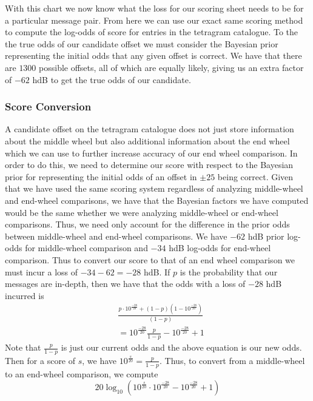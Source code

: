 \noindent With this chart we now know what the loss for our scoring sheet needs to be for a particular message pair. From here we can use our exact same scoring method to compute the log-odds of score for entries in the tetragram catalogue. To the the true odds of our candidate offset we must consider the Bayesian prior representing the initial odds that any given offset is correct. We have that there are $1300$ possible offsets, all of which are equally likely, giving us an extra factor of $-62$ hdB to get the true odds of our candidate.
\subsubsection{Score Conversion} A candidate offset on the tetragram catalogue does not just store information about the middle wheel but also additional information about the end wheel which we can use to further increase accuracy of our end wheel comparison. In order to do this, we need to determine our score with respect to the Bayesian prior for representing the initial odds of an offset in $\pm25$ being correct. Given that we have used the same scoring system regardless of analyzing middle-wheel and end-wheel comparisons, we have that the Bayesian factors we have computed would be the same whether we were analyzing middle-wheel or end-wheel comparisons. Thus, we need only account for the difference in the prior odds between middle-wheel and end-wheel comparisons. We have $-62$ hdB prior log-odds for middle-wheel comparison and $-34$ hdB log-odds for end-wheel comparison. Thus to convert our score to that of an end wheel comparison we must incur a loss of $-34-62 = -28$ hdB. If $p$ is the probability that our messages are in-depth, then we have that the odds with a loss of $-28$ hdB incurred is
\begin{align*}
	 & \frac{p\cdot10^{\frac{-28}{20}} + (1-p)(1-10^{\frac{-28}{20}})}{(1-p)} \\
	 & = 10^{\frac{-28}{20}}\frac{p}{1-p}-10^{\frac{-28}{20}} + 1
\end{align*}
Note that $\frac{p}{1-p}$ is just our current odds and the above equation is our new odds. Then for a score of $s$, we have $10^\frac{s}{20} = \frac{p}{1-p}$. Thus, to convert from a middle-wheel to an end-wheel comparison, we compute
\[
	20\log_{10}(10^\frac{s}{20}\cdot10^{\frac{-28}{20}} -10^{\frac{-28}{20}} + 1)
\]


